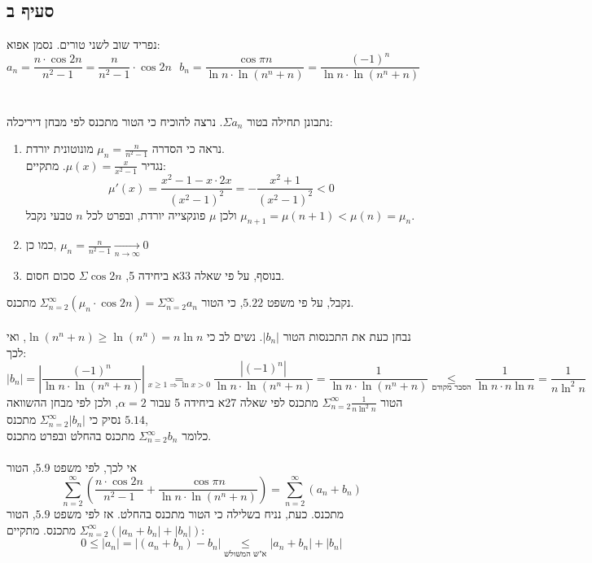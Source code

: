 \documentclass{article}
\newcommand\underrel[2]{\mathrel{\mathop{#2}\limits_{#1}}}
\begin{document}
\subsection*{סעיף ב}
נפריד שוב לשני טורים. נסמן אפוא:
\[
    a_n=\frac{n\cdot \cos 2n}{n^2-1} = \frac{n}{n^2-1} \cdot \cos 2n \ \ \
    b_n = \frac{\cos \pi n}{\ln n \cdot \ln(n^n+n)}=\frac{(-1)^n}{\ln n \cdot \ln(n^n+n)}
\]
\\\\
נתבונן תחילה בטור $\Sigma a_n$. נרצה להוכיח כי הטור מתכנס לפי מבחן דיריכלה:
\begin{enumerate}[i]
    \item נראה כי הסדרה $\mu_n=\frac{n}{n^2-1}$ מונוטונית יורדת. \\
          נגדיר $\mu(x)=\frac{x}{x^2-1}$. מתקיים:
          \[
              \mu'(x)=\frac{x^2-1-x\cdot 2x}{(x^2-1)^2}=
              -\frac{x^2+1}{(x^2-1)^2} < 0
          \]
          ולכן $\mu$ פונקצייה יורדת, ובפרט לכל $n$ טבעי נקבל $\mu_{n+1}=\mu(n+1)<\mu(n)=\mu_n$.
    \item כמו כן, $\mu_n=\frac{n}{n^2-1}\xrightarrow[n\rightarrow\infty]{}0$
    \item בנוסף, על פי שאלה 33א ביחידה 5, $\Sigma \cos 2n$ סכום חסום.
\end{enumerate}
נקבל, על פי משפט $5.22$, כי הטור $\Sigma_{n=2}^\infty (\mu_n \cdot \cos 2n)=\Sigma_{n=2}^\infty a_n$ מתכנס.
\\\\
נבחן כעת את התכנסות הטור $|b_n|$. נשים לב כי $\ln(n^n+n)\geq \ln(n^n)=n\ln n$, ואי לכך:
\[
    |b_n|=\left|\frac{(-1)^n}{\ln n \cdot \ln(n^n+n)}\right| \underrel{x\geq 1 \Rightarrow \ln x > 0}{=}
    \frac{|(-1)^n|}{\ln n \cdot \ln(n^n+n)} =
    \frac{1}{\ln n \cdot \ln(n^n+n)} \underrel{\text{הסבר מקודם}}{\leq}
    \frac{1}{\ln n \cdot n \ln n} = \frac{1}{n\ln^2n}
\]
הטור $\Sigma_{n=2}^\infty \frac{1}{n\ln^2n}$
מתכנס לפי שאלה 27א ביחידה 5 עבור $\alpha = 2$,
ולכן לפי מבחן ההשוואה $5.14$ נסיק כי $\Sigma_{n=2}^\infty |b_n|$ מתכנס, \\
כלומר $\Sigma_{n=2}^\infty b_n$ מתכנס בהחלט ובפרט מתכנס.
\\\\
אי לכך, לפי משפט 5.9, הטור
\[
    \sum_{n=2}^\infty (\frac{n\cdot \cos 2n}{n^2-1}+\frac{\cos \pi n}{\ln n \cdot \ln(n^n+n)})=
    \sum_{n=2}^\infty (a_n + b_n)
\]
מתכנס. כעת, נניח בשלילה כי הטור מתכנס בהחלט.
אז לפי משפט $5.9$,
הטור $\Sigma_{n=2}^\infty(|a_n+b_n|+|b_n|)$ מתכנס.
מתקיים:
\[
    0\leq |a_n|=|(a_n+b_n)-b_n|\underrel{\text{א"ש המשולש}}{\leq}
    |a_n+b_n|+|b_n|
\]
\end{document}

